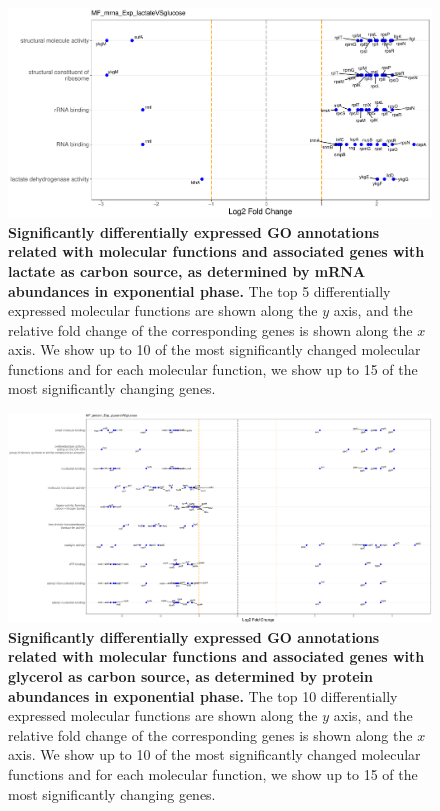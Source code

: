 \documentclass[a4paper]{article}
\begin{document}
\begin{figure}[!htb]
	\includegraphics[width=1.0\textwidth]{../../d_figures/MF03_mrna_Exp_lactateVSglucose_withTitle.pdf}
	\caption[Significantly differentially expressed GO annotations associated with molecular functions for mRNA samples in exponential phase tested for lactate against glucose]
	{\textbf{Significantly differentially expressed GO annotations related with molecular functions and associated genes with lactate as carbon source, as determined by mRNA abundances in exponential phase.} The top 5 differentially expressed molecular functions are shown along the $y$ axis, and the relative fold change of the corresponding genes is shown along the $x$ axis. We show up to 10 of the most significantly changed molecular functions and for each molecular function, we show up to 15 of the most significantly changing genes.}
\end{figure}


\begin{figure}[!htb]
	\includegraphics[width=1.0\textwidth]{../../d_figures/MF04_protein_Exp_glycerolVSglucose_withTitle.pdf}
	\caption[Significantly differentially expressed GO annotations associated with molecular functions for protein samples in exponential phase tested for glycerol against glucose]
	{\textbf{Significantly differentially expressed GO annotations related with molecular functions and associated genes with glycerol as carbon source, as determined by protein abundances in exponential phase.} The top 10 differentially expressed molecular functions are shown along the $y$ axis, and the relative fold change of the corresponding genes is shown along the $x$ axis. We show up to 10 of the most significantly changed molecular functions and for each molecular function, we show up to 15 of the most significantly changing genes.}
\end{figure}
\end{document}
